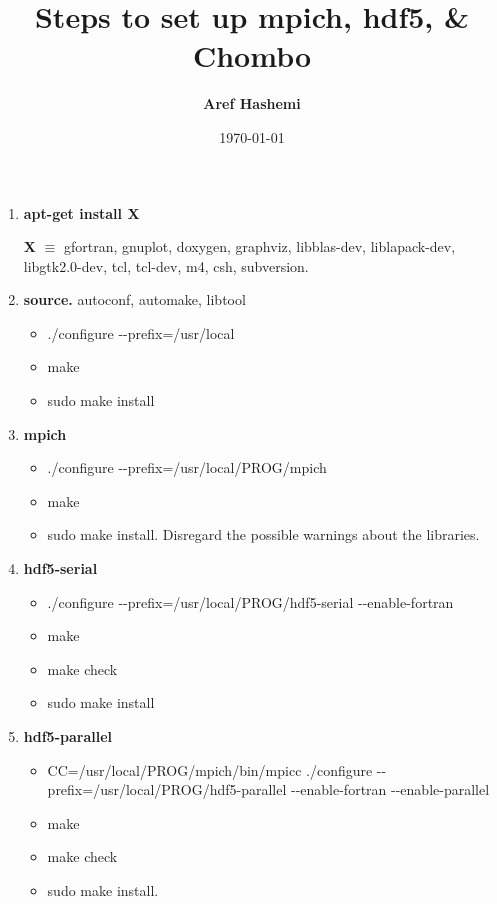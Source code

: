 \documentclass{article}
\title{\textbf{Steps to set up mpich, hdf5, \& Chombo}}
\author{\textbf{Aref Hashemi}}
\date{\today}
\begin{document}
\maketitle

\begin{enumerate}[label=\textbf{\arabic*})]
\item \textbf{apt-get install X}

  \textbf{X} $\equiv$ gfortran, gnuplot, doxygen, graphviz, libblas-dev, liblapack-dev, libgtk2.0-dev, tcl, tcl-dev, m4, csh, subversion.
  
\item \textbf{source.} autoconf, automake, libtool

  \begin{itemize}
  \item .\slash configure -{}-prefix=\slash usr\slash local
  \item make
  \item sudo make install
  \end{itemize}

\item \textbf{mpich}
  
  \begin{itemize}
  \item .\slash configure -{}-prefix=\slash usr\slash local\slash PROG\slash mpich
  \item make
  \item sudo make install. Disregard the possible warnings about the libraries.
  \end{itemize}
  
\item \textbf{hdf5-serial}

  \begin{itemize} 
  \item .\slash configure -{}-prefix=\slash usr\slash local\slash PROG\slash hdf5-serial -{}-enable-fortran
  \item make
  \item make check
  \item sudo make install
  \end{itemize}


\item \textbf{hdf5-parallel}

  \begin{itemize}
  \item CC=\slash usr\slash local\slash PROG\slash mpich\slash bin\slash mpicc .\slash configure -{}-prefix=\slash usr\slash local\slash PROG\slash hdf5-parallel -{}-enable-fortran -{}-enable-parallel
  \item make
  \item make check
  \item sudo make install.
  \end{itemize}


\end{enumerate}
\end{document}
